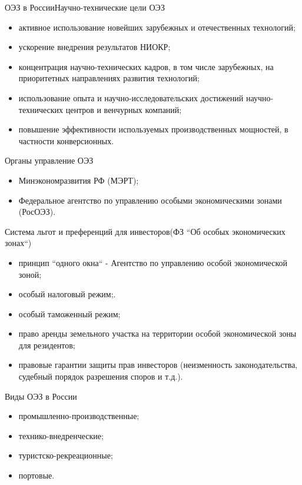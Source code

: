 \documentclass[_Venture_p3.tex]{subfiles}
\begin{document}
\begin{frame}[allowframebreaks]{ОЭЗ в России}{Научно-технические цели ОЭЗ}
\begin{itemize}
	\item активное использование новейших зарубежных и отечественных технологий;
	\item ускорение внедрения результатов НИОКР;
	\item концентрация научно-технических кадров, в том числе зарубежных, на приоритетных направлениях развития технологий;
	
	\pagebreak
	\item использование опыта и научно-исследовательских достижений научно-технических центров и венчурных компаний;
	\item повышение эффективности используемых производственных мощностей, в частности конверсионных.
\end{itemize}
\end{frame}



\begin{frame}{Органы управление ОЭЗ}{}
\begin{itemize}
	\item Минэкономразвития РФ (МЭРТ);
	\item Федеральное агентство по управлению особыми экономическими зонами (РосОЭЗ).
\end{itemize}
\end{frame}

 
\begin{frame}[allowframebreaks]{Система льгот и преференций для инвесторов}{(ФЗ ``Об особых экономических зонах``)}
\begin{itemize}
	\item принцип ``одного окна`` - Агентство по управлению особой экономической зоной;
	\item особый налоговый режим;.
	\item особый таможенный режим;
	
	\pagebreak
	\item право аренды земельного участка на территории особой экономической зоны для резидентов;
	\item правовые гарантии защиты прав инвесторов (неизменность законодательства, судебный порядок разрешения споров и т.д.).
\end{itemize}
\end{frame}

\begin{frame}[allowframebreaks]{Виды ОЭЗ в России}{}
\begin{itemize}
	\item промышленно-производственные;
	\item технико-внедренческие;
	\item туристско-рекреационные;
	\item портовые.
\end{itemize}
\end{frame}
\end{document}
